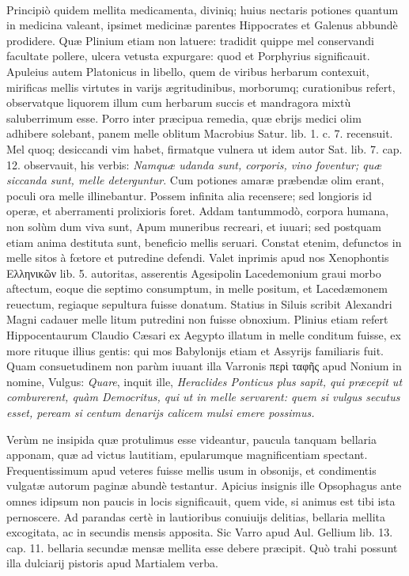 \documentclass[a4paper, 11pt, oneside, polutonikogreek, latin]{article}
\begin{document}
\paragraph{}
Principiò quidem mellita medicamenta, diviniq; huius nectaris potiones quantum in medicina valeant, ipsimet medicinæ parentes Hippocrates et Galenus abbundè prodidere. Quæ Plinium etiam non latuere: tradidit quippe mel conservandi facultate pollere, ulcera vetusta expurgare: quod et Porphyrius significauit. Apuleius autem Platonicus in libello, quem de viribus herbarum contexuit, mirificas mellis virtutes in varijs ægritudinibus, morborumq; curationibus refert, observatque liquorem illum cum herbarum succis et mandragora mixtù saluberrimum esse. Porro inter præcipua remedia, quæ ebrijs medici olim adhibere solebant, panem melle oblitum Macrobius Satur. lib. 1. c. 7. recensuit. Mel quoq; desiccandi vim habet, firmatque vulnera ut idem autor Sat. lib. 7. cap. 12. observauit, his verbis: \emph{Namquæ udanda sunt, corporis, vino foventur; quæ siccanda sunt, melle deterguntur}. Cum potiones amaræ præbendæ olim erant, poculi ora melle illinebantur. Possem infinita alia recensere; sed longioris id operæ, et aberramenti prolixioris foret. Addam tantummodò, corpora humana, non solùm dum viva sunt, Apum muneribus recreari, et iuuari; sed postquam etiam anima destituta sunt, beneficio mellis seruari. Constat etenim, defunctos in melle sitos à fœtore et putredine defendi. Valet inprimis apud nos Xenophontis Ελληνικῶν lib. 5. autoritas, asserentis Agesipolin Lacedemonium graui morbo aftectum, eoque die septimo consumptum, in melle positum, et Lacedæmonem reuectum, regiaque sepultura fuisse donatum. Statius in Siluis scribit Alexandri Magni cadauer melle litum putredini non fuisse obnoxium. Plinius etiam refert Hippocentaurum Claudio Cæsari ex Aegypto illatum in melle conditum fuisse, ex more rituque illius gentis: qui mos Babylonijs etiam et Assyrijs familiaris fuit. Quam consuetudinem non parùm iuuant illa Varronis περὶ ταφῆς apud Nonium in nomine, Vulgus: \emph{Quare}, inquit ille, \emph{Heraclides Ponticus plus sapit, qui præcepit ut comburerent, quàm Democritus, qui ut in melle servarent: quem si vulgus secutus esset, peream si centum denarijs calicem mulsi emere possimus.}

Verùm ne insipida quæ protulimus esse videantur, paucula tanquam bellaria apponam, quæ ad victus lautitiam, epularumque magnificentiam spectant. Frequentissimum apud veteres fuisse mellis usum in obsonijs, et condimentis vulgatæ autorum paginæ abundè testantur. Apicius insignis ille Opsophagus ante omnes idipsum non paucis in locis significauit, quem vide, si animus est tibi ista pernoscere. Ad parandas certè in lautioribus conuiuijs delitias, bellaria mellita excogitata, ac in secundis mensis apposita. Sic Varro apud Aul. Gellium lib. 13. cap. 11. bellaria secundæ mensæ mellita esse debere præcipit. Quò trahi possunt illa dulciarij pistoris apud Martialem verba.
\end{document}
